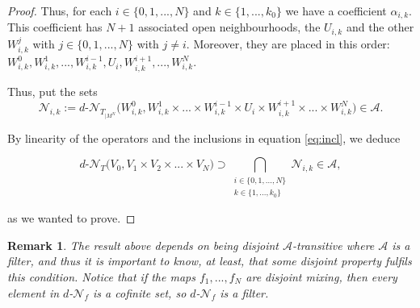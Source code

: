 \documentclass[11pt,reqno]{article}
\newtheorem{remark}[statement]{Remark}
\def\dret{d\text{-}\ret}
\def\ret{\mathcal{N}}
\def\aa{\alpha}
\def\eor{\hfill{\circledR}}
\begin{document}
\begin{proof}
Thus, for each $i\in \{0,1,...,N\}$ and $k\in \{1,..., k_0\}$ we have a coefficient $\aa_{i,k}$. This coefficient has $N+1$ associated open neighbourhoods, the $U_{i,k}$ and the other $W_{i,k}^j$ with $j\in\{0,1,...,N\}$ with $j\neq i$. Moreover, they are placed in this order: $W_{i,k}^0, W_{i,k}^1,...,W_{i,k}^{i-1}, U_i,W_{i,k}^{i+1},...,W_{i,k}^{N} $.

Thus, put the sets
\begin{equation*}
 \ret_{i,k}:=   \dret_{ T_{|M^N} }\big(W_{i,k}^0 , W_{i,k}^1\times...\times W_{i,k}^{i-1}\times U_i\times W_{i,k}^{i+1}\times ...\times W_{i,k}^{N}\big)\in  \mathcal{A}.
\end{equation*}

By linearity of the operators and the inclusions in equation \eqref{eq:incl},
we deduce

\begin{equation*}
    \dret_ {T} \big(V_0, V_1\times  V_2\times ...\times V_N \big) \supset  \bigcap_{\substack{i\in\{0,1,...,N\} \\ %
    k\in \{1,...,k_0\} }}  \ret_{i,k} \in \mathcal{A},
\end{equation*}

as we wanted to prove.


\end{proof}




\begin{remark} \label{rem:mixing}
\rm The result above depends on being disjoint $\mathcal{A}$-transitive where $\mathcal{A}$ is a filter, and thus it is important to know, at least, that some disjoint property fulfils  this condition. Notice that if the maps $f_1,...,f_N$ are disjoint mixing, then every element in  $d$-$\ret_f$ is a cofinite set, so $d$-$\ret_f$ is a filter. \eor
\end{remark}
\end{document}
